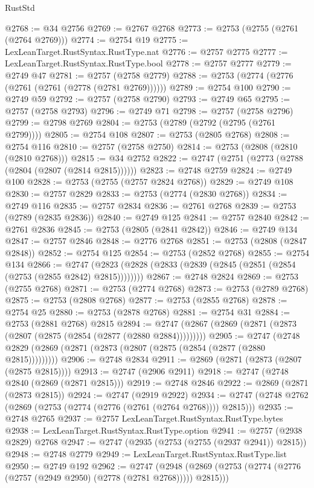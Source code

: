 \begin{lexlean}{RustStd}
\begin{coremodule}
{\begin{coremodule}
{{{{{{{{{{{{{{{{{{{{{{{{{{{{{{{{{@2768 := @34 @2756
@2769 := @2767 @2768
@2773 := @2753 (@2755 (@2761 (@2764 @2769)))
@2774 := @2754 @19
@2775 := LexLeanTarget.RustSyntax.RustType.nat
@2776 := @2757 @2775
@2777 := LexLeanTarget.RustSyntax.RustType.bool
@2778 := @2757 @2777
@2779 := @2749 @47
@2781 := @2757 (@2758 @2779)
@2788 := @2753 (@2774 (@2776 (@2761 (@2761 (@2778 (@2781 @2769))))))
@2789 := @2754 @100
@2790 := @2749 @59
@2792 := @2757 (@2758 @2790)
@2793 := @2749 @65
@2795 := @2757 (@2758 @2793)
@2796 := @2749 @71
@2798 := @2757 (@2758 @2796)
@2799 := @2798 @2769
@2804 := @2753 (@2789 (@2792 (@2795 (@2761 @2799))))
@2805 := @2754 @108
@2807 := @2753 (@2805 @2768)
@2808 := @2754 @116
@2810 := @2757 (@2758 @2750)
@2814 := @2753 (@2808 (@2810 (@2810 @2768)))
@2815 := @34 @2752
@2822 := @2747 (@2751 (@2773 (@2788 (@2804 (@2807 (@2814 @2815))))))
@2823 := @2748 @2759
@2824 := @2749 @100
@2828 := @2753 (@2755 (@2757 @2824 @2768))
@2829 := @2749 @108
@2830 := @2757 @2829
@2833 := @2753 (@2774 (@2830 @2768))
@2834 := @2749 @116
@2835 := @2757 @2834
@2836 := @2761 @2768
@2839 := @2753 (@2789 (@2835 @2836))
@2840 := @2749 @125
@2841 := @2757 @2840
@2842 := @2761 @2836
@2845 := @2753 (@2805 (@2841 @2842))
@2846 := @2749 @134
@2847 := @2757 @2846
@2848 := @2776 @2768
@2851 := @2753 (@2808 (@2847 @2848))
@2852 := @2754 @125
@2854 := @2753 (@2852 @2768)
@2855 := @2754 @134
@2866 := @2747 (@2823 (@2828 (@2833 (@2839 (@2845 (@2851 (@2854 (@2753 (@2855 @2842) @2815))))))))
@2867 := @2748 @2824
@2869 := @2753 (@2755 @2768)
@2871 := @2753 (@2774 @2768)
@2873 := @2753 (@2789 @2768)
@2875 := @2753 (@2808 @2768)
@2877 := @2753 (@2855 @2768)
@2878 := @2754 @25
@2880 := @2753 (@2878 @2768)
@2881 := @2754 @31
@2884 := @2753 (@2881 @2768) @2815
@2894 := @2747 (@2867 (@2869 (@2871 (@2873 (@2807 (@2875 (@2854 (@2877 (@2880 @2884)))))))))
@2905 := @2747 (@2748 @2829 (@2869 (@2871 (@2873 (@2807 (@2875 (@2854 (@2877 (@2880 @2815)))))))))
@2906 := @2748 @2834
@2911 := @2869 (@2871 (@2873 (@2807 (@2875 @2815))))
@2913 := @2747 (@2906 @2911)
@2918 := @2747 (@2748 @2840 (@2869 (@2871 @2815)))
@2919 := @2748 @2846
@2922 := @2869 (@2871 (@2873 @2815))
@2924 := @2747 (@2919 @2922)
@2934 := @2747 (@2748 @2762 (@2869 (@2753 (@2774 (@2776 (@2761 (@2764 @2768)))) @2815)))
@2935 := @2748 @2765
@2937 := @2757 LexLeanTarget.RustSyntax.RustType.bytes
@2938 := LexLeanTarget.RustSyntax.RustType.option
@2941 := @2757 (@2938 @2829) @2768
@2947 := @2747 (@2935 (@2753 (@2755 (@2937 @2941)) @2815))
@2948 := @2748 @2779
@2949 := LexLeanTarget.RustSyntax.RustType.list
@2950 := @2749 @192
@2962 := @2747
    (@2948 (@2869 (@2753 (@2774 (@2776 (@2757 (@2949 @2950) (@2778 (@2781 @2768))))) @2815)))
}}}}}}}}}}}}}}}}}}}}}}}}}}}}}}}}}
\end{coremodule}}
\end{coremodule}
\end{lexlean}
